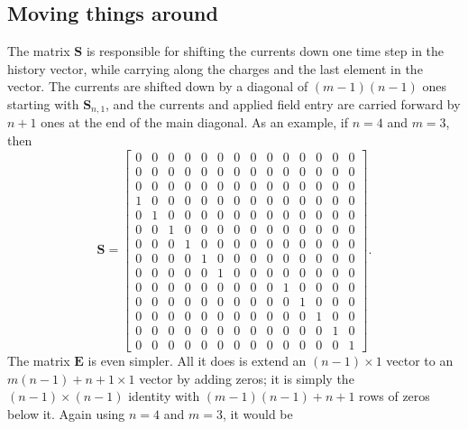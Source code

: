\documentclass{article}
\newcommand{\mat}{\mathbf}
\begin{document}
\subsection{Moving things around}
The matrix $\mat{S}$ is responsible for shifting the currents down one time step in the history vector, while carrying along the charges and the last element in the vector. The currents are shifted down by a diagonal of $(m-1)(n-1)$ ones starting with $\mat{S}_{n,1}$, and the currents and applied field entry are carried forward by $n+1$ ones at the end of the main diagonal. As an example, if $n=4$ and $m=3$, then
\begin{equation}
\mat{S} = \begin{bmatrix}
0 & 0 & 0 & 0 & 0 & 0 & 0 & 0 & 0 & 0 & 0 & 0 & 0 & 0 \\
0 & 0 & 0 & 0 & 0 & 0 & 0 & 0 & 0 & 0 & 0 & 0 & 0 & 0 \\
0 & 0 & 0 & 0 & 0 & 0 & 0 & 0 & 0 & 0 & 0 & 0 & 0 & 0 \\
1 & 0 & 0 & 0 & 0 & 0 & 0 & 0 & 0 & 0 & 0 & 0 & 0 & 0 \\
0 & 1 & 0 & 0 & 0 & 0 & 0 & 0 & 0 & 0 & 0 & 0 & 0 & 0 \\
0 & 0 & 1 & 0 & 0 & 0 & 0 & 0 & 0 & 0 & 0 & 0 & 0 & 0 \\
0 & 0 & 0 & 1 & 0 & 0 & 0 & 0 & 0 & 0 & 0 & 0 & 0 & 0 \\
0 & 0 & 0 & 0 & 1 & 0 & 0 & 0 & 0 & 0 & 0 & 0 & 0 & 0 \\
0 & 0 & 0 & 0 & 0 & 1 & 0 & 0 & 0 & 0 & 0 & 0 & 0 & 0 \\
0 & 0 & 0 & 0 & 0 & 0 & 0 & 0 & 0 & 1 & 0 & 0 & 0 & 0 \\
0 & 0 & 0 & 0 & 0 & 0 & 0 & 0 & 0 & 0 & 1 & 0 & 0 & 0 \\
0 & 0 & 0 & 0 & 0 & 0 & 0 & 0 & 0 & 0 & 0 & 1 & 0 & 0 \\
0 & 0 & 0 & 0 & 0 & 0 & 0 & 0 & 0 & 0 & 0 & 0 & 1 & 0 \\
0 & 0 & 0 & 0 & 0 & 0 & 0 & 0 & 0 & 0 & 0 & 0 & 0 & 1
\end{bmatrix}.
\end{equation}
The matrix $\mat{E}$ is even simpler. All it does is extend an $(n-1) \times 1$ vector to an $m(n-1)+n+1 \times 1$ vector by adding zeros; it is simply the $(n-1) \times (n-1)$ identity with $(m-1)(n-1)+n+1$ rows of zeros below it. Again using $n=4$ and $m=3$, it would be
\end{document}
